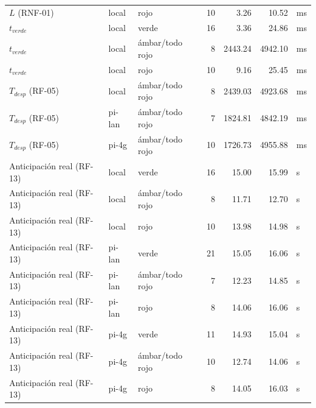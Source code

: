\begin{table}[H]
\begin{tabular}{lllrrrl}
$L$ (RNF-01) & local & rojo & 10 & 3.26 & 10.52 & ms \\
$t_{verde}$ & local & verde & 16 & 3.36 & 24.86 & ms \\
$t_{verde}$ & local & ámbar/todo rojo & 8 & 2443.24 & 4942.10 & ms \\
$t_{verde}$ & local & rojo & 10 & 9.16 & 25.45 & ms \\
$T_{desp}$ (RF-05) & local & ámbar/todo rojo & 8 & 2439.03 & 4923.68 & ms \\
$T_{desp}$ (RF-05) & pi-lan & ámbar/todo rojo & 7 & 1824.81 & 4842.19 & ms \\
$T_{desp}$ (RF-05) & pi-4g & ámbar/todo rojo & 10 & 1726.73 & 4955.88 & ms \\
Anticipación real (RF-13) & local & verde & 16 & 15.00 & 15.99 & s \\
Anticipación real (RF-13) & local & ámbar/todo rojo & 8 & 11.71 & 12.70 & s \\
Anticipación real (RF-13) & local & rojo & 10 & 13.98 & 14.98 & s \\
Anticipación real (RF-13) & pi-lan & verde & 21 & 15.05 & 16.06 & s \\
Anticipación real (RF-13) & pi-lan & ámbar/todo rojo & 7 & 12.23 & 14.85 & s \\
Anticipación real (RF-13) & pi-lan & rojo & 8 & 14.06 & 16.06 & s \\
Anticipación real (RF-13) & pi-4g & verde & 11 & 14.93 & 15.04 & s \\
Anticipación real (RF-13) & pi-4g & ámbar/todo rojo & 10 & 12.74 & 14.06 & s \\
Anticipación real (RF-13) & pi-4g & rojo & 8 & 14.05 & 16.03 & s \\
\bottomrule
\end{tabular}
\end{table}
